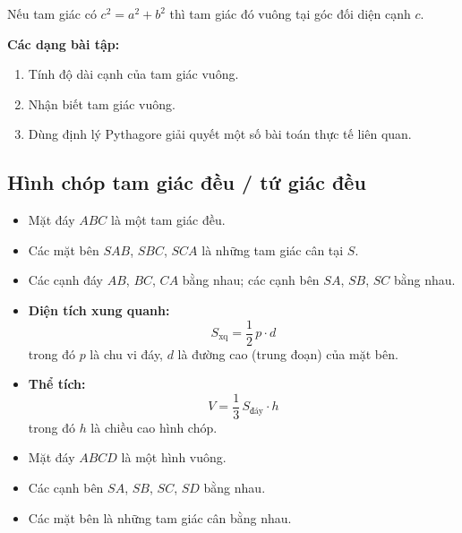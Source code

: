 \documentclass[12pt,a4paper]{article}
\begin{document}
\begin{dinhly}[title={Định lý Pythagore đảo}]
  Nếu tam giác có $c^2 = a^2 + b^2$ thì tam giác đó vuông tại góc đối diện cạnh $c$.
\end{dinhly}

\medskip\noindent\textbf{Các dạng bài tập:}
\begin{enumerate}[label=\textbf{Dạng \arabic*:}, leftmargin=*, align=left]
  \item Tính độ dài cạnh của tam giác vuông.
  \item Nhận biết tam giác vuông.
  \item Dùng định lý Pythagore giải quyết một số bài toán thực tế liên quan.
\end{enumerate}

\subsection{Hình chóp tam giác đều / tứ giác đều}

\begin{dinhnghia}[title={Hình chóp tam giác đều $S.ABC$}]
  \begin{itemize}
    \item Mặt đáy $ABC$ là một tam giác đều.
    \item Các mặt bên $SAB$, $SBC$, $SCA$ là những tam giác cân tại $S$.
    \item Các cạnh đáy $AB$, $BC$, $CA$ bằng nhau; các cạnh bên $SA$, $SB$, $SC$ bằng nhau.
  \end{itemize}
\end{dinhnghia}

\begin{congthuc}[title={Diện tích xung quanh và thể tích}]
  \begin{itemize}
    \item \textbf{Diện tích xung quanh:}
      \[ S_{\text{xq}} = \frac{1}{2}\,p \cdot d \]
      trong đó $p$ là chu vi đáy, $d$ là đường cao (trung đoạn) của mặt bên.
    \item \textbf{Thể tích:}
      \[ V = \frac{1}{3}\,S_{\text{đáy}} \cdot h \]
      trong đó $h$ là chiều cao hình chóp.
  \end{itemize}
\end{congthuc}

\begin{dinhnghia}[title={Hình chóp tứ giác đều $S.ABCD$}]
  \begin{itemize}
    \item Mặt đáy $ABCD$ là một hình vuông.
    \item Các cạnh bên $SA$, $SB$, $SC$, $SD$ bằng nhau.
    \item Các mặt bên là những tam giác cân bằng nhau.
  \end{itemize}
\end{dinhnghia}
\end{document}
